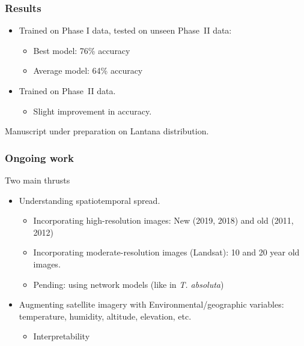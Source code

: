 \documentclass[xcolor=table,xcolor=dvipsnames]{beamer}
\newcommand{\tuta}{\emph{T. absoluta}}
\begin{document}
\begin{frame}
    \frametitle{Results}
\begin{itemize}
    \item Trained on Phase I data, tested on unseen Phase~II data:
    \begin{itemize}
        \item Best model: 76\% accuracy
        \item Average model: 64\% accuracy
    \end{itemize}
    \item Trained on Phase~II data.
    \begin{itemize}
        \item Slight improvement in accuracy.
    \end{itemize}
\end{itemize}
Manuscript under preparation on {Lantana} distribution.
\end{frame}
\begin{frame}
\frametitle{Ongoing work} 
Two main thrusts
\begin{itemize}
    \item Understanding spatiotemporal spread.
    \begin{itemize}
        \item Incorporating high-resolution images: New (2019, 2018) and
        old (2011, 2012)
        \item Incorporating moderate-resolution images (Landsat): 10 and 20
        year old images.
        \item Pending: using network models (like in \tuta)
    \end{itemize}
    \item Augmenting satellite imagery with Environmental/geographic
    variables: temperature, humidity, altitude, elevation, etc.
    \begin{itemize}
        \item Interpretability
    \end{itemize}
\end{itemize}
\end{frame}
\end{document}
